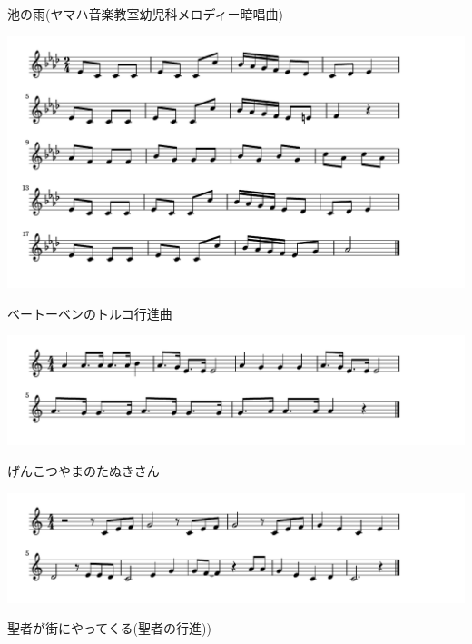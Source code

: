 \documentclass[a4paper]{ltjsarticle}
\begin{document}
\vspace{-10mm} \hspace{10mm}
池の雨(ヤマハ音楽教室幼児科メロディー暗唱曲)

\includegraphics[clip]{turkbeethoven_crop.pdf}

\vspace{-10mm} \hspace{10mm}
ベートーベンのトルコ行進曲

\includegraphics[clip]{genkotsu_crop.pdf}

\vspace{-10mm} \hspace{10mm}
げんこつやまのたぬきさん

\includegraphics[clip]{seija_crop.pdf}

\vspace{-10mm} \hspace{10mm}
聖者が街にやってくる(聖者の行進))
\end{document}
